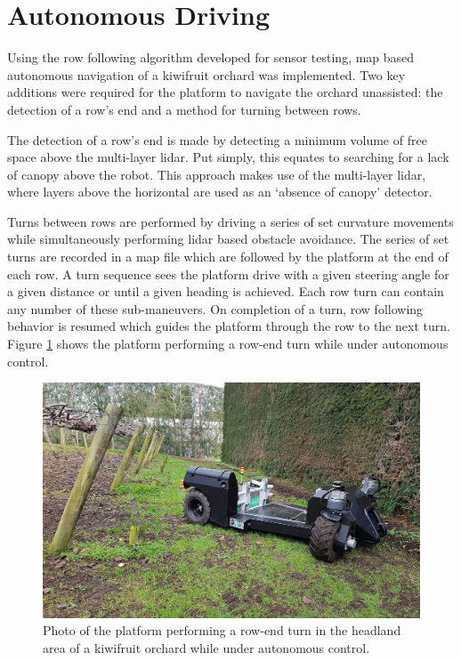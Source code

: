 \documentclass[preprint,authoryear,12pt]{elsarticle}
\begin{document}
\section{Autonomous Driving}
\label{sect:autonomous}
    Using the row following algorithm developed for sensor testing, map based autonomous navigation of a kiwifruit orchard was implemented.
    Two key additions were required for the platform to navigate the orchard unassisted: the detection of a row's end and a method for turning between rows.

    The detection of a row's end is made by detecting a minimum volume of free space above the multi-layer lidar.
    Put simply, this equates to searching for a lack of canopy above the robot.
    This approach makes use of the multi-layer lidar, where layers above the horizontal are used as an `absence of canopy' detector.

    Turns between rows are performed by driving a series of set curvature movements while simultaneously performing lidar based obstacle avoidance.
    The series of set turns are recorded in a map file which are followed by the platform at the end of each row.
    A turn sequence sees the platform drive with a given steering angle for a given distance or until a given heading is achieved.
    Each row turn can contain any number of these sub-maneuvers.
    On completion of a turn, row following behavior is resumed which guides the platform through the row to the next turn.
    Figure \ref{fig:suzy_turning} shows the platform performing a row-end turn while under autonomous control.

    \begin{figure}[htb]
        \centering
        \includegraphics[width=\linewidth]{imgs/photos/suzy_turning.jpg}
        \caption{
            Photo of the platform performing a row-end turn in the headland area of a kiwifruit orchard while under autonomous control.
        }
        \label{fig:suzy_turning}
    \end{figure}
\end{document}
